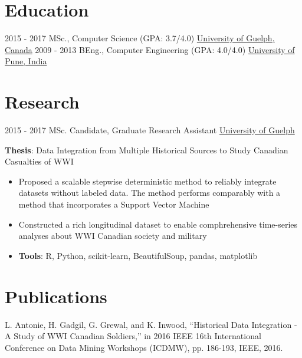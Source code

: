 \documentclass[a4paper]{tenseconds} %
\begin{document}
\makeprofile %

\section{Education}

\begin{twenty} %
    \twentyitem
        {2015 - 2017}
        {}
        {MSc., Computer Science \textnormal{(GPA: 3.7/4.0)}}
        {\href{http://www.uoguelph.ca/}{University of Guelph, Canada}}
        {}
        {}
    \twentyitem
        {2009 - 2013}
        {}
        {BEng., Computer Engineering \textnormal{(GPA: 4.0/4.0)}}
        {\href{http://www.unipune.ac.in/}{University of Pune, India}}
        {}
        {}
\end{twenty}

\section{Research}
\begin{twenty}
    \twentyitem
        {2015 - 2017}
        {}
        {MSc. Candidate, Graduate Research Assistant}
        {\href{http://www.uoguelph.ca/}{University of Guelph}}
        {}
        {
        \textbf{Thesis}: Data Integration from Multiple Historical Sources to Study Canadian Casualties of WWI
        {\begin{itemize}
        \item Proposed a scalable stepwise deterministic method to reliably integrate datasets without labeled data. The method performs comparably with a method that incorporates a Support Vector Machine
        \item Constructed a rich longitudinal dataset to enable comphrehensive time-series analyses about WWI Canadian society and military
        \item \textbf{Tools}: R, Python, scikit-learn, BeautifulSoup, pandas, matplotlib \vspace{2mm}
        \end{itemize}}
        }
\end{twenty}

\section{Publications}
L. Antonie, H. Gadgil, G. Grewal, and K. Inwood, “Historical Data Integration - A Study of WWI Canadian Soldiers,” in 2016 IEEE 16th International Conference on Data Mining Workshops (ICDMW), pp. 186-193, IEEE, 2016. \vspace{2mm}
\end{document}
